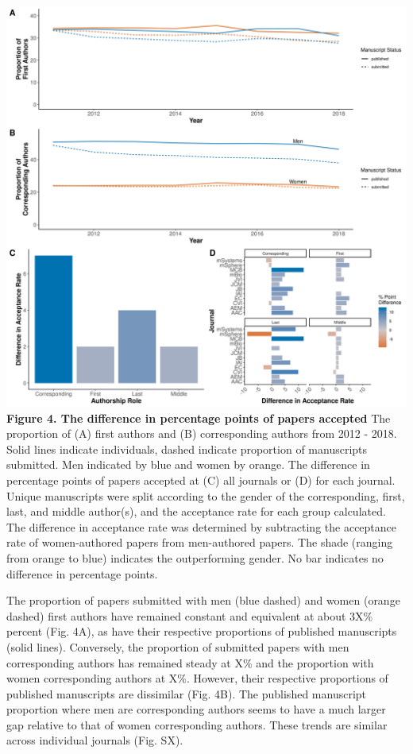 \documentclass[11pt,]{article}
\begin{document}
\includegraphics{Figure_4.png} \textbf{Figure 4. The difference in
percentage points of papers accepted} The proportion of (A) first
authors and (B) corresponding authors from 2012 - 2018. Solid lines
indicate individuals, dashed indicate proportion of manuscripts
submitted. Men indicated by blue and women by orange. The difference in
percentage points of papers accepted at (C) all journals or (D) for each
journal. Unique manuscripts were split according to the gender of the
corresponding, first, last, and middle author(s), and the acceptance
rate for each group calculated. The difference in acceptance rate was
determined by subtracting the acceptance rate of women-authored papers
from men-authored papers. The shade (ranging from orange to blue)
indicates the outperforming gender. No bar indicates no difference in
percentage points.

The proportion of papers submitted with men (blue dashed) and women
(orange dashed) first authors have remained constant and equivalent at
about 3X\% percent (Fig. 4A), as have their respective proportions of
published manuscripts (solid lines). Conversely, the proportion of
submitted papers with men corresponding authors has remained steady at
X\% and the proportion with women corresponding authors at X\%. However,
their respective proportions of published manuscripts are dissimilar
(Fig. 4B). The published manuscript proportion where men are
corresponding authors seems to have a much larger gap relative to that
of women corresponding authors. These trends are similar across
individual journals (Fig. SX).
\end{document}
